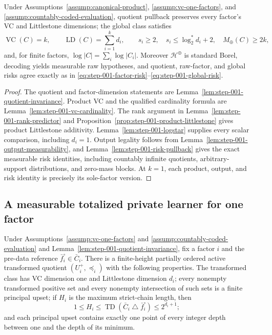 \begin{proposition}
\label{prop:step-001-structural-certificate}
Under Assumptions~\ref{assump:canonical-product},
\ref{assump:vc-one-factors}, and
\ref{assump:countably-coded-evaluation}, quotient pullback preserves every
factor's VC and Littlestone dimensions; the global class satisfies
\[
\operatorname{VC}(C)=k,\qquad
\operatorname{LD}(C)=\sum_{i=1}^k d_i,\qquad
s_i\ge2,\quad s_i\le\log_2^*d_i+2,\quad M_{\oplus}(C)\ge2k,
\]
and, for finite factors, \(\log|C|=\sum_i\log|C_i|\).  Moreover
\(\mathcal H^{\oplus}\) is standard Borel, decoding yields measurable raw
hypotheses, and quotient, raw-factor, and global risks agree exactly as in
\eqref{eq:step-001-factor-risk}--\eqref{eq:step-001-global-risk}.
\end{proposition}

\begin{proof}
The quotient and factor-dimension statements are
Lemma~\ref{lem:step-001-quotient-invariance}.  Product VC and the qualified
cardinality formula are Lemma~\ref{lem:step-001-vc-cardinality}.  The rank
argument in Lemma~\ref{lem:step-001-rank-predictor} and
Proposition~\ref{prop:step-001-product-littlestone} gives product
Littlestone additivity.  Lemma~\ref{lem:step-001-logstar} supplies every
scalar comparison, including \(d_i=1\).  Output legality follows from
Lemma~\ref{lem:step-001-output-measurability}, and
Lemma~\ref{lem:step-001-risk-pullback} gives the exact measurable risk
identities, including countably infinite quotients, arbitrary-support
distributions, and zero-mass blocks.  At \(k=1\), each product, output, and
risk identity is precisely its sole-factor version.
\end{proof}

\subsection{A measurable totalized private learner for one factor}
\label{app:step-002}

\begin{lemma}
\label{lem:step-002-order-geometry}
Under Assumptions~\ref{assump:vc-one-factors} and
\ref{assump:countably-coded-evaluation} and
Lemma~\ref{lem:step-001-quotient-invariance}, fix a factor \(i\) and the
pre-data reference \(\bar f_i^\circ\in\bar C_i\).  There is a finite-height
partially ordered active transformed quotient \((U_i^+,\preceq_i)\) with
the following properties.  The transformed class has VC dimension one and
Littlestone dimension \(d_i\); every nonempty transformed positive set and
every nonempty intersection of such sets is a finite principal upset; if
\(H_i\) is the maximum strict-chain length, then
\begin{equation}\label{eq:step-002-height}
1\le H_i\le \operatorname{TD}(\bar C_i\mathbin\triangle\bar f_i^\circ)
\le2^{d_i+1};
\end{equation}
and each principal upset contains exactly one point of every integer depth
between one and the depth of its minimum.
\end{lemma}


